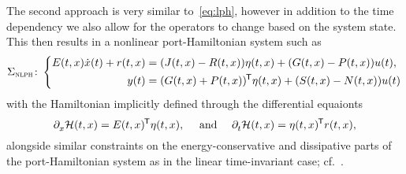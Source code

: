 \begin{remark}
    The second approach is very similar to~\eqref{eq:lph}, however in addition to the time dependency we also allow for the operators to change based on the system state.
    This then results in a nonlinear port-Hamiltonian system such as
    \begin{equation}\label{eq:nlph}
        \Sigma_{\textsc{nlph}} \colon \left\lbrace
        \begin{aligned}
            E(t, x) \dot{x}(t) + r(t, x) &= (J(t, x) - R(t, x)) \eta(t, x) + (G(t, x) - P(t, x)) u(t), \\
            y(t) &= (G(t, x) + P(t, x))\trans \eta(t, x) + (S(t, x) - N(t, x)) u(t)
        \end{aligned}
        \right.
    \end{equation}
    with the Hamiltonian implicitly defined through the differential equaionts
    \begin{equation*}
        \pd{} \mcl{H}(t, x) = E(t, x)\trans \eta(t, x),\quad \text{ and }\quad \pd[t]{} \mcl{H}(t, x) = \eta(t, x)\trans r(t, x),
    \end{equation*}
    alongside similar constraints on the energy-conservative and dissipative parts of the port-Hamiltonian system as in the linear time-invariant case; cf.~\cite[Definition~4.1]{Mehrmann2022}.
\end{remark}

